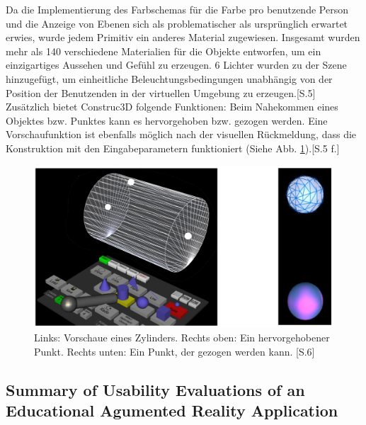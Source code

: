 \documentclass[deutsch]{llncs}
\begin{document}
Da die Implementierung des Farbschemas für die Farbe pro benutzende Person und die Anzeige von Ebenen sich als problematischer als ursprünglich erwartet erwies, wurde jedem Primitiv ein anderes Material zugewiesen. Insgesamt wurden mehr als 140 verschiedene Materialien für die Objekte entworfen, um ein einzigartiges Aussehen und Gefühl zu erzeugen. 6 Lichter wurden zu der Szene hinzugefügt, um einheitliche Beleuchtungsbedingungen unabhängig von der Position der Benutzenden in der virtuellen Umgebung zu erzeugen.[S.5]\\
Zusätzlich bietet Construc3D folgende Funktionen: Beim Nahekommen eines Objektes bzw. Punktes kann es hervorgehoben bzw. gezogen werden. Eine Vorschaufunktion ist ebenfalls möglich nach der visuellen Rückmeldung, dass die Konstruktion mit den Eingabeparametern funktioniert (Siehe Abb. \ref{Vorschau}).[S.5 f.]\\ 
\begin{figure}
\begin{center}
\includegraphics[scale=0.3]{Bilder/Vorschau.PNG}
\caption{Links: Vorschaue eines Zylinders. Rechts oben: Ein hervorgehobener Punkt.
Rechts unten: Ein Punkt, der gezogen werden kann. [S.6]}
\label{Vorschau}
\end{center}
\end{figure}


\subsection{Summary of Usability Evaluations of an Educational Agumented Reality Application}
\end{document}
